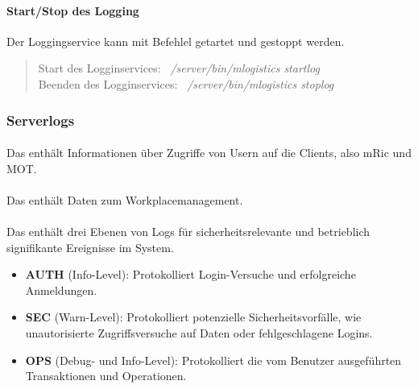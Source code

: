 \paragraph{Start/Stop des Logging}
Der Loggingservice kann mit Befehlel getartet und gestoppt werden.
\begin{quote}
	Start des Logginservices: \textit{~/server/bin/mlogistics startlog}\\
	Beenden des Logginservices: \textit{~/server/bin/mlogistics stoplog}
\end{quote}



\subsubsection{Serverlogs}


\paragraph{\mlogisticsAccessLog}
Das \texttt{\mlogisticsAccessLog} enthält Informationen über Zugriffe von Usern auf die Clients, also mRic und MOT.

\paragraph{\mlogisticsAliveLog}
Das \texttt{\mlogisticsAliveLog} enthält Daten zum Workplacemanagement.

\paragraph{\mlogisticsAuditLog}
Das \texttt{\mlogisticsAuditLog} enthält drei Ebenen von Logs für sicherheitsrelevante und betrieblich signifikante Ereignisse im System.
\begin{itemize}
	\item \textbf{AUTH} (Info-Level): Protokolliert Login-Versuche und erfolgreiche Anmeldungen.
	\item \textbf{SEC} (Warn-Level): Protokolliert potenzielle Sicherheitsvorfälle, wie unautorisierte Zugriffsversuche auf Daten oder fehlgeschlagene Logins.
	\item \textbf{OPS} (Debug- und Info-Level): Protokolliert die vom Benutzer ausgeführten Transaktionen und Operationen.
\end{itemize}

